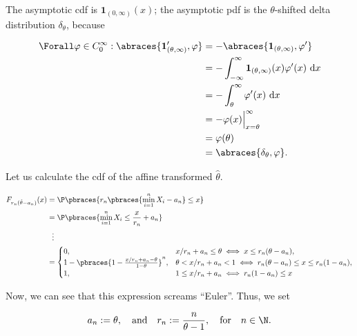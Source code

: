 \begin{solution}
\begin{enumerate}[label = (\alph*)]
    The asymptotic cdf is $\mathbf 1_{(0, \infty)}(x)$;
    the asymptotic pdf is the $\theta$-shifted delta distribution $\delta_\theta$, because

    \begin{align*}
        \Forall \varphi \in C_0^\infty:
            \abraces{\mathbf 1_{(\theta, \infty)}^\prime, \varphi}
            & =
            - \abraces{\mathbf 1_{(\theta, \infty)}, \varphi^\prime} \\
            & =
            -\int_{-\infty}^\infty
                \mathbf 1_{(\theta, \infty)}(x) \varphi^\prime(x)
                ~ \mathrm d x \\
            & =
            -\int_\theta^\infty
                \varphi^\prime(x)
                ~ \mathrm d x \\
            & =
            -\varphi(x) \Big |_{x=\theta}^\infty \\
            & =
            \varphi(\theta) \\
            & =
            \abraces{\delta_\theta, \varphi}.
    \end{align*}

    Let us calculate the cdf of the affine transformed $\hat \theta$.

    \begin{align*}
        F_{r_n (\hat \theta - a_n)}(x)
        & =
        \P \pbraces{r_n \pbraces{\min_{i=1}^n X_i - a_n} \leq x} \\
        & =
        \P \pbraces{\min_{i=1}^n X_i \leq \frac{x}{r_n} + a_n} \\
        & ~~ \vdots \\
        & =
        \begin{cases}
            0,
            & x / r_n + a_n \leq \theta
            \iff
            x \leq r_n (\theta - a_n), \\
            1 - \pbraces{1 - \frac{x / r_n + a_n - \theta}{1 - \theta}}^n,
            & \theta < x / r_n + a_n < 1
            \iff
            r_n (\theta - a_n) \leq x \leq r_n (1 - a_n), \\
            1,
            & 1 \leq x / r_n + a_n
            \iff
            r_n (1 - a_n) \leq x
        \end{cases}
    \end{align*}

    Now, we can see that this expression screams \enquote{Euler}.
    Thus, we set

    \begin{align*}
        a_n := \theta,
        \quad
        \text{and}
        \quad
        r_n := \frac{n}{\theta - 1},
        \quad
        \text{for}
        \quad
        n \in \N.
    \end{align*}


\end{enumerate}
\end{solution}
